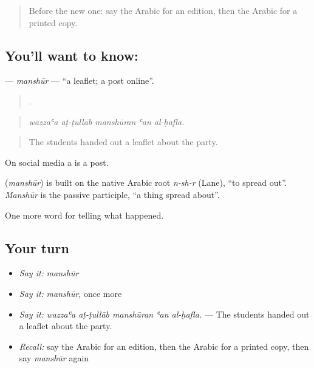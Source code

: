\label{lesson:AR-C350-manshur}



\begin{quote}
Before the new one: say the Arabic for an edition, then the Arabic for a printed copy.
\end{quote}

\subsection*{You'll want to know: }
\textbf{} — \emph{manshūr} — \textquotedblleft{}a leaflet; a post online\textquotedblright{}.

\begin{quote}
    .
\end{quote}

\begin{quote}
\emph{wazzaʿa aṭ-ṭullāb manshūran ʿan al-ḥafla.}
\end{quote}

\begin{quote}
The students handed out a leaflet about the party.
\end{quote}

On social media a  is a post.

\begin{cousinweb}
\textbf{} (\emph{manshūr}) is built on the native Arabic root \emph{n-sh-r} (Lane), \textquotedblleft{}to spread out\textquotedblright{}. \emph{Manshūr} is the passive participle, \textquotedblleft{}a thing spread about\textquotedblright{}.
\end{cousinweb}

\begin{grammarlens}[title={What you've built}]
One more word for telling what happened.
\end{grammarlens}

\subsection*{Your turn}
\begin{itemize}
\raggedright
  \item \emph{Say it:} \emph{manshūr}
  \item \emph{Say it:} \emph{manshūr}, once more
  \item \emph{Say it:} \emph{wazzaʿa aṭ-ṭullāb manshūran ʿan al-ḥafla.} — The students handed out a leaflet about the party.
  \item \emph{Recall:} say the Arabic for an edition, then the Arabic for a printed copy, then say \emph{manshūr} again
\end{itemize}

